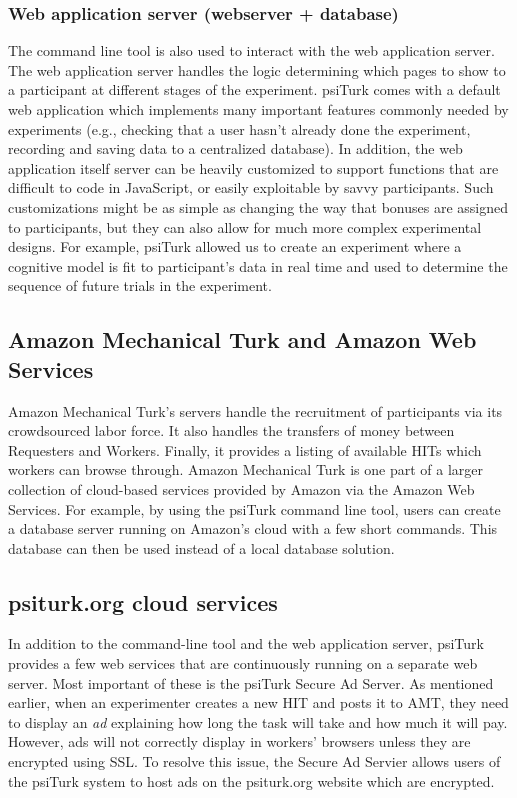 \documentclass[twocolumn]{svjour3}          %
\newcommand{\psiturk}[0]{\textsf{psiTurk}}
\begin{document}
\subsubsection{Web application server (webserver + database)}

The command line tool is also used to interact with the web application server.
The web application server handles the logic determining which pages to show
to a participant at different stages of the experiment.  \psiturk{} comes with
a default web application which implements many important features commonly
needed by experiments (e.g., checking that a user hasn't already done the experiment,
recording and saving data to a centralized database).  In addition, the web application itself
server can be heavily customized to support functions that are difficult to code in JavaScript,
or easily exploitable by savvy participants. Such customizations might be as simple as changing
the way that bonuses are assigned to participants, but they can also allow for much
more complex experimental designs. For example, \psiturk{} allowed us to create an
experiment where a cognitive model is fit to participant's data in real time and used to determine the sequence of future
trials in the experiment.

\subsection{Amazon Mechanical Turk and Amazon Web Services}

Amazon Mechanical Turk's servers handle the recruitment of participants via
its crowdsourced labor force.  It also handles the transfers of money between Requesters and
Workers.  Finally, it provides a listing of available HITs which workers can browse 
through.  Amazon Mechanical Turk is one part of a larger collection
of cloud-based services provided by Amazon via the Amazon Web Services.
For example, by using the \psiturk{} command line tool, users can create a
database server running on Amazon's cloud with a few short commands.  This database
can then be used instead of a local database solution.

\subsection{\textsf{psiturk.org} cloud services}
In addition to the command-line tool and the web application server, \psiturk{}
provides a few web services that are continuously running on a separate web server.
Most important of these is the \psiturk{} Secure Ad Server.  As mentioned earlier, when an experimenter
creates a new HIT and posts it to AMT, they need to display an \emph{ad} explaining how long the task will take and how
much it will pay.  However, ads will not correctly display
in workers' browsers unless they are encrypted using SSL.  To resolve this issue, the
Secure Ad Servier allows users of the \psiturk{} system to host ads on the \textsf{psiturk.org}
website which are encrypted.
\end{document}
